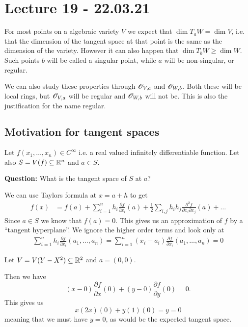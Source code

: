 



\section{Lecture 19 - 22.03.21}



For most points on a algebraic variety $V$ we expect that $\dim T_a W = \dim V$, i.e. that the dimension of the tangent space at that point is the same as the dimension of the variety. However it can also happen that $\dim T_b W\geq \dim W$. Such points $b$ will be called a singular point, while $a$ will be non-singular, or regular. 

We can also study these properties through $\mathscr{O}_{V, a}$ and $\mathscr{O}_{W, b}$. Both these will be local rings, but $\mathscr{O}_{V, a}$ will be regular and $\mathscr{O}_{W, b}$ will not be. This is also the justification for the name regular. 

\subsection{Motivation for tangent spaces}

Let $f(x_1, \ldots, x_n)\in C^\infty$ i.e. a real valued infinitely differentiable function. Let also $S=V(f)\subseteq \mathbb{R}^n$ and $a\in S$. 

\textbf{Question:} What is the tangent space of $S$ at $a$?

We can use Taylors formula at $x=a+h$ to get
\begin{align*}
    f(x) 
    &= f(a) + \sum_{i=1}^n h_i \frac{\partial f}{\partial x_i}(a)+\frac{1}{2}\sum_{i,j}h_i h_j \frac{\partial^2 f}{\partial x_i \partial x_j}(a)+\ldots
\end{align*}
Since $a\in S$ we know that $f(a)=0$. This gives us an approximation of $f$ by a ``tangent hyperplane''. We ignore the higher order terms and look only at 
\begin{align*}
    \sum_{i=1}^n h_i \frac{\partial f}{\partial x_i}(a_1, \ldots, a_n) 
    = \sum_{i=1}^n (x_i-a_i) \frac{\partial f}{\partial x_i}(a_1, \ldots, a_n) = 0
\end{align*}

\begin{example}
Let $V = V(Y-X^2)\subseteq \mathbb{R}^2$ and $a = (0,0)$. 

Then we have 
\begin{equation*}
    (x-0)\frac{\partial f}{\partial x}(0) + (y-0)\frac{\partial f}{\partial y}(0) = 0.
\end{equation*}
This gives us
\begin{equation*}
    x(2x)(0) + y(1)(0) = y = 0
\end{equation*}
meaning that we must have $y=0$, as would be the expected tangent space.
\end{example}

